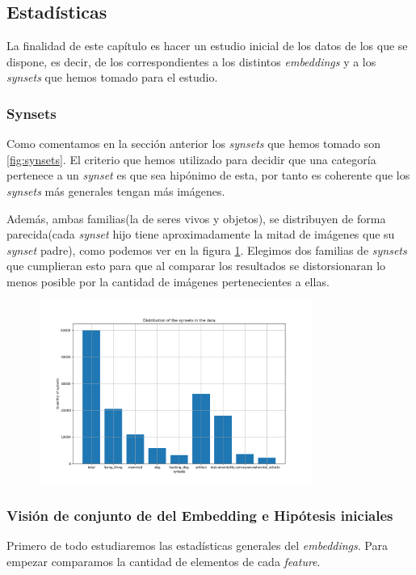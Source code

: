\documentclass[12,twoside]{TFG-GM}
\theoremstyle{definition}
\theoremstyle{remark}
\begin{document}
\subsection{Estadísticas}\label{se:stats}
La finalidad de este capítulo es hacer un estudio inicial de los datos de los que se dispone, es decir, de los correspondientes a los distintos \textit{embeddings} y a los \textit{synsets} que hemos tomado para el estudio. 

\subsubsection{Synsets}

Como comentamos en la sección anterior los \textit{synsets} que hemos tomado son \ref{fig:synsets}. 
El criterio que hemos utilizado para decidir que una categoría pertenece a un \textit{synset} es que sea hipónimo de esta, por tanto es coherente que los \textit{synsets} más generales tengan más imágenes. 
 
Además, ambas familias(la de seres vivos y objetos), se distribuyen de forma parecida(cada \textit{synset} hijo tiene aproximadamente la mitad de imágenes que su \textit{synset} padre), como podemos ver en la figura \ref{fig:totalsynsets}. Elegimos dos familias de \textit{synsets} que cumplieran esto para que al comparar los resultados se distorsionaran lo menos posible por la cantidad de imágenes pertenecientes a ellas.

\begin{figure}[H] 
	\centering
	\includegraphics[width=0.8\textwidth] {Images/plots/25/distribution_of_synsets_bar.png}
	\caption{ 
	\label{fig:totalsynsets}}
\end{figure}


\subsubsection{Visión de conjunto de del Embedding e Hipótesis iniciales}
Primero de todo estudiaremos las estadísticas generales del \textit{embeddings}.
Para empezar comparamos la cantidad de elementos de cada \textit{feature}. 
\end{document}
